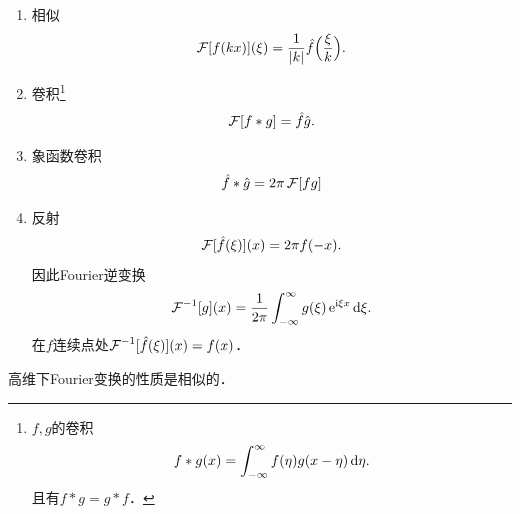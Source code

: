 \begin{enumerate}
\begin{subequations}
			\end{subequations}
	\item 相似
			\begin{equation}
				\label{eq:mmp-fourier-dilation}
				\operatorname{\mathcal{F}}[f(kx)](\xi) = \frac1{\lvert k\rvert}\hat f\Bigl(\frac\xi{k}\Bigr).
			\end{equation}
	\item 卷积\footnote{$f,g$的卷积\[f \ast g(x) = \int_{-\infty}^\infty f(\eta)g(x - \eta)\mathop{}\!\mathrm{d}\eta.\]且有$f \ast g = g \ast f$．}
			\begin{equation}
				\label{eq:mmp-fourier-convolution}
				\operatorname{\mathcal{F}}[f \ast g] = \hat f\hat g.
			\end{equation}
	\item 象函数卷积
			\begin{equation}
				\label{eq:mmp-fourier-product}
				\hat f \ast \hat g = 2\pi\operatorname{\mathcal{F}}[fg]
			\end{equation}
	\item 反射
			\begin{equation}
				\label{eq:mmp-fourier-reflection}
				\operatorname{\mathcal{F}}[\hat f(\xi)](x) = 2\pi f(-x).
			\end{equation}
			因此Fourier逆变换
			\[\operatorname{\mathcal{F}}^{-1}[g](x) = \frac1{2\pi}\int_{-\infty}^\infty g(\xi)\mathop{}\!\mathrm{e}^{\mathrm{i}\xi x}\mathop{}\!\mathrm{d}\xi.\]
			在$f$连续点处$\operatorname{\mathcal{F}}^{-1}[\hat f(\xi)](x) = f(x)$．
\end{enumerate}
高维下Fourier变换的性质是相似的．
